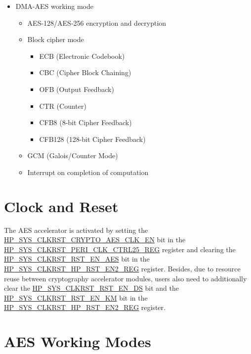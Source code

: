\documentclass[main\_\_EN.tex]{subfiles}
\begin{document}
    \begin{itemize}
    \item DMA-AES working mode
        \begin{itemize}
            \item AES-128/AES-256 encryption and decryption
            \item Block cipher mode
                \begin{itemize}
                    \item ECB (Electronic Codebook)
                    \item CBC (Cipher Block Chaining)
                    \item OFB (Output Feedback)
                    \item CTR (Counter)
                    \item CFB8 (8-bit Cipher Feedback)
                    \item CFB128 (128-bit Cipher Feedback)
                \end{itemize}
            \item GCM (Galois/Counter Mode)
            \item Interrupt on completion of computation
        \end{itemize}
    \end{itemize}

\section{Clock and Reset}

The AES accelerator is activated by setting the \hyperref[fielddesc:HPSYSCLKRSTCRYPTOAESCLKEN]{HP\_SYS\_CLKRST\_CRYPTO\_AES\_CLK\_EN} bit in the \hyperref[regdesc:HPSYSCLKRSTPERICLKCTRL25REG]{HP\_SYS\_CLKRST\_PERI\_CLK\_CTRL25\_REG} register and clearing the \hyperref[fielddesc:HPSYSCLKRSTRSTENAES]{HP\_SYS\_CLKRST\_RST\_EN\_AES} bit in the \hyperref[regdesc:HPSYSCLKRSTHPRSTEN2REG]{HP\_SYS\_CLKRST\_HP\_RST\_EN2\_REG} register. Besides, due to resource reuse between cryptography accelerator modules, users also need to additionally clear the \hyperref[fielddesc:HPSYSCLKRSTRSTENDS]{HP\_SYS\_CLKRST\_RST\_EN\_DS} bit and the \hyperref[fielddesc:HPSYSCLKRSTRSTENKM]{HP\_SYS\_CLKRST\_RST\_EN\_KM} bit in the \hyperref[regdesc:HPSYSCLKRSTHPRSTEN2REG]{HP\_SYS\_CLKRST\_HP\_RST\_EN2\_REG} register.



\clearpage
\section{AES Working Modes}
\end{document}
